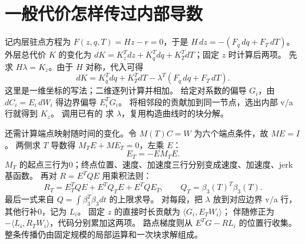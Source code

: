 \section{一般代价怎样传过内部导数}
记内层驻点方程为 $F(z,q,T)=Hz-r=0$，于是
$H\,dz=-(F_q\,dq+F_T\,dT)$。
外层总代价 $K$ 的变化为
$dK=K_z^Tdz+K_q^Tdq+K_T^TdT$；固定 $z$ 时计算后两项。
先求 $H\lambda=K_z$。由于 $H$ 对称，代入可得
\begin{equation}
 dK=K_q^Tdq+K_T^TdT-\lambda^T(F_q\,dq+F_T\,dT).
 \label{eq:spline-general-adjoint}
\end{equation}
这里是一维坐标的写法；二维逐列计算并相加。
给定对系数的偏导 $G_i$，由 $dC_i=E_i\,dW_i$ 得边界偏导 $E_i^TG_i$。
将相邻段的贡献加到同一节点，选出内部 v/a 行就得到 $K_z$。
 调用已有的  求 $\lambda$，复用构造曲线时的块分解。

还需计算端点映射随时间的变化。令 $M(T)C=W$ 为六个端点条件，故 $ME=I$。
两侧求 $T$ 导数得 $M_TE+ME_T=0$，左乘 $E$：
\begin{equation}
 E_T=-EM_TE.
\end{equation}
$M_T$ 的起点三行为0；终点位置、速度、加速度三行分别变成速度、加速度、jerk 基函数。
再对 $R=E^TQE$ 用乘积法则：
\[
 R_T=E_T^TQE+E^TQ_TE+E^TQE_T,\qquad Q_T=\beta_3(T)^T\beta_3(T).
\]
最后一式来自 $Q=\int\beta_3^T\beta_3dt$ 的上限求导。
对每段，把 $\lambda$ 放到对应边界 v/a 行，其他行补0，记为 $L_i$。
固定 $z$ 的直接时长贡献为 $\langle G_i,E_TW_i\rangle$；
伴随修正为 $-\langle L_i,R_TW_i\rangle$，代码分别累加这两项。
路点梯度则从 $E^TG-RL_i$ 的位置行收集。
整条传播仍由固定规模的局部运算和一次块求解组成。

